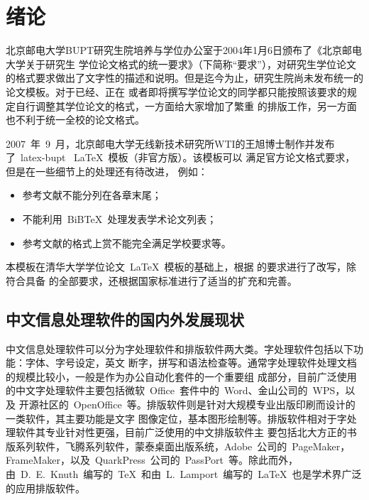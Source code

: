 % 

\chapter{绪论}

北京邮电大学\gls*{BUPT}研究生院培养与学位办公室于2004年1月6日颁布了《北京邮电大学关于研究生
学位论文格式的统一要求》（下简称“要求”）\cite{BUPT_Thesis_Format_2004}，对研究生学位论文
的格式要求做出了文字性的描述和说明。但是迄今为止，研究生院尚未发布统一的论文模板。对于已经、正在
或者即将撰写学位论文的同学都只能按照该要求的规定自行调整其学位论文的格式，一方面给大家增加了繁重
的排版工作，另一方面也不利于统一全校的论文格式。

2007~年~9~月，北京邮电大学无线新技术研究所\gls*{WTI}的王旭博士制作并发布了~latex-bupt
~\LaTeX~模板（非官方版）\cite{latex-bupt}。该模板可以
满足官方论文格式要求\cite{BUPT_Thesis_Format_2004}，但是在一些细节上的处理还有待改进，
例如：
\begin{itemize}
\item 参考文献不能分列在各章末尾；
\item 不能利用~BiBTeX~处理发表学术论文列表；
\item 参考文献的格式上赏不能完全满足学校要求等。
\end{itemize}

本模板在清华大学学位论文~\LaTeX~模板\cite{thuthesis}的基础上，根据
的要求进行了改写，除符合具备
的全部要求，还根据国家标准进行了适当的扩充和完善。

\section{中文信息处理软件的国内外发展现状}
中文信息处理软件可以分为字处理软件和排版软件两大类。字处理软件包括以下功能：字体、字号设定，英文
断字，拼写和语法检查等。通常字处理软件处理文档的规模比较小，一般是作为办公自动化套件的一个重要组
成部分，目前广泛使用的中文字处理软件主要包括微软~Office~套件中的~Word、金山公司的~WPS，以及
开源社区的~OpenOffice~等。排版软件则是针对大规模专业出版印刷而设计的一类软件，其主要功能是文字
图像定位，基本图形绘制等。排版软件相对于字处理软件其专业针对性更强，目前广泛使用的中文排版软件主
要包括北大方正的书版系列软件，飞腾系列软件，蒙泰桌面出版系统，Adobe~公司的~PageMaker，
FrameMaker，以及~QuarkPress~公司的~PassPort~等。除此而外，由~D.~E.~Knuth~编写的~\TeX~和由~L.~Lamport~编写的~\LaTeX~也是学术界广泛的应用排版软件。

